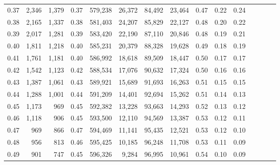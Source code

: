 \begin{tabular}{rrrcrrrrrrrrrrr}
0.37 &   2,346 &  1,379 &                                       0.37 &  579,238 &   26,372 &   84,492 &   23,464 &  0.47 &  0.22 &                         0.24 \\
0.38 &   2,165 &  1,337 &                                       0.38 &  581,403 &   24,207 &   85,829 &   22,127 &  0.48 &  0.20 &                         0.22 \\
0.39 &   2,017 &  1,281 &                                       0.39 &  583,420 &   22,190 &   87,110 &   20,846 &  0.48 &  0.19 &                         0.21 \\
0.40 &   1,811 &  1,218 &                                       0.40 &  585,231 &   20,379 &   88,328 &   19,628 &  0.49 &  0.18 &                         0.19 \\
0.41 &   1,761 &  1,181 &                                       0.40 &  586,992 &   18,618 &   89,509 &   18,447 &  0.50 &  0.17 &                         0.17 \\
0.42 &   1,542 &  1,123 &                                       0.42 &  588,534 &   17,076 &   90,632 &   17,324 &  0.50 &  0.16 &                         0.16 \\
0.43 &   1,387 &  1,061 &                                       0.43 &  589,921 &   15,689 &   91,693 &   16,263 &  0.51 &  0.15 &                         0.15 \\
0.44 &   1,288 &  1,001 &                                       0.44 &  591,209 &   14,401 &   92,694 &   15,262 &  0.51 &  0.14 &                         0.13 \\
0.45 &   1,173 &    969 &                                       0.45 &  592,382 &   13,228 &   93,663 &   14,293 &  0.52 &  0.13 &                         0.12 \\
0.46 &   1,118 &    906 &                                       0.45 &  593,500 &   12,110 &   94,569 &   13,387 &  0.53 &  0.12 &                         0.11 \\
0.47 &     969 &    866 &                                       0.47 &  594,469 &   11,141 &   95,435 &   12,521 &  0.53 &  0.12 &                         0.10 \\
0.48 &     956 &    813 &                                       0.46 &  595,425 &   10,185 &   96,248 &   11,708 &  0.53 &  0.11 &                         0.09 \\
0.49 &     901 &    747 &                                       0.45 &  596,326 &    9,284 &   96,995 &   10,961 &  0.54 &  0.10 &                         0.09 \\

\end{tabular}
